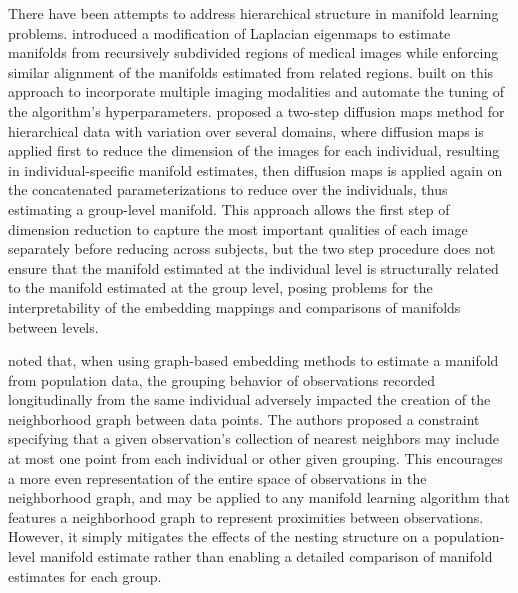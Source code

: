 \documentclass[11pt,reqno]{article}
\theoremstyle{definition}
\begin{document}
There have been attempts to address hierarchical structure in manifold learning problems. \cite{bhatiaHierarchicalManifoldLearning2012} introduced a modification of Laplacian eigenmaps to estimate manifolds from recursively subdivided regions of medical images while enforcing similar alignment of the manifolds estimated from related regions. \cite{freicheCharacterizingMyocardialIschemia2022} built on this approach to incorporate multiple imaging modalities and automate the tuning of the algorithm's hyperparameters. \cite{gaoHierarchicalManifoldLearning2019} proposed a two-step diffusion maps method for hierarchical data with variation over several domains, where diffusion maps is applied first to reduce the dimension of the images for each individual, resulting in individual-specific manifold estimates, then diffusion maps is applied again on the concatenated parameterizations to reduce over the individuals, thus estimating a group-level manifold. This approach allows the first step of dimension reduction to capture the most important qualities of each image separately before reducing across subjects, but the two step procedure does not ensure that the manifold estimated at the individual level is structurally related to the manifold estimated at the group level, posing problems for the interpretability of the embedding mappings and comparisons of manifolds between levels.

\cite{guerreroGroupconstrainedManifoldLearning2017} noted that, when using graph-based embedding methods to estimate a manifold from population data, the grouping behavior of observations recorded longitudinally from the same individual adversely impacted the creation of the neighborhood graph between data points. The authors proposed a constraint specifying that a given observation's collection of nearest neighbors may include at most one point from each individual or other given grouping. This encourages a more even representation of the entire space of observations in the neighborhood graph, and may be applied to any manifold learning algorithm that features a neighborhood graph to represent proximities between observations. However, it simply mitigates the effects of the nesting structure on a population-level manifold estimate rather than enabling a detailed comparison of manifold estimates for each group.
\end{document}
